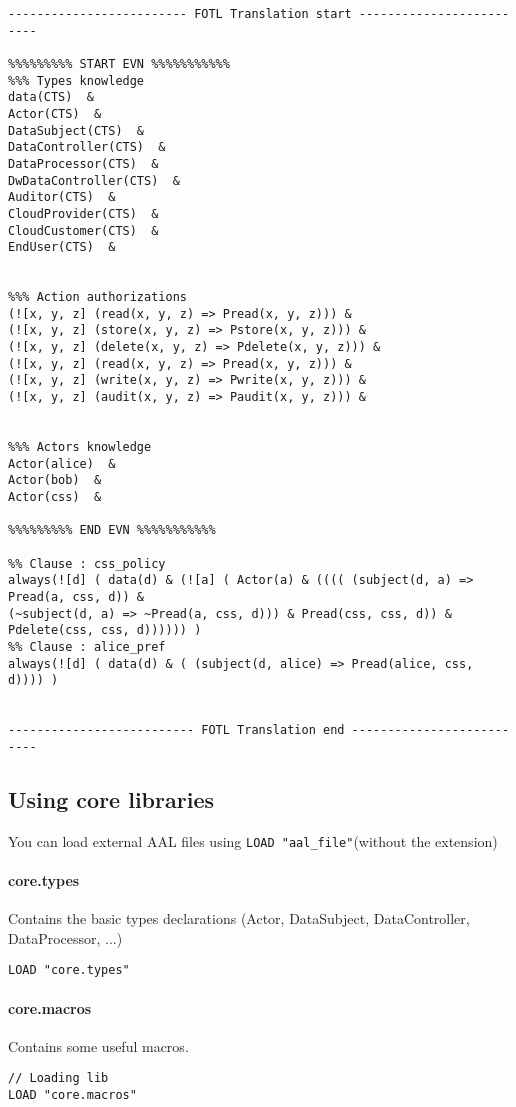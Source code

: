 \begin{itemize}
{\begin{lstlisting}
------------------------- FOTL Translation start -------------------------

%%%%%%%%% START EVN %%%%%%%%%%%
%%% Types knowledge
data(CTS)  &
Actor(CTS)  &
DataSubject(CTS)  &
DataController(CTS)  &
DataProcessor(CTS)  &
DwDataController(CTS)  &
Auditor(CTS)  &
CloudProvider(CTS)  &
CloudCustomer(CTS)  &
EndUser(CTS)  &


%%% Action authorizations
(![x, y, z] (read(x, y, z) => Pread(x, y, z))) &
(![x, y, z] (store(x, y, z) => Pstore(x, y, z))) &
(![x, y, z] (delete(x, y, z) => Pdelete(x, y, z))) &
(![x, y, z] (read(x, y, z) => Pread(x, y, z))) &
(![x, y, z] (write(x, y, z) => Pwrite(x, y, z))) &
(![x, y, z] (audit(x, y, z) => Paudit(x, y, z))) &


%%% Actors knowledge
Actor(alice)  &
Actor(bob)  &
Actor(css)  &

%%%%%%%%% END EVN %%%%%%%%%%%

%% Clause : css_policy
always(![d] ( data(d) & (![a] ( Actor(a) & (((( (subject(d, a) => Pread(a, css, d)) &
(~subject(d, a) => ~Pread(a, css, d))) & Pread(css, css, d)) & Pdelete(css, css, d)))))) )
%% Clause : alice_pref
always(![d] ( data(d) & ( (subject(d, alice) => Pread(alice, css, d)))) )


-------------------------- FOTL Translation end --------------------------
\end{lstlisting}
}
\end{itemize}





\subsection{Using core libraries}
You can load external AAL files using \texttt{LOAD "aal\_file"}(without the extension) 

\paragraph{core.types} Contains the basic types declarations (Actor, DataSubject, DataController, DataProcessor, ...)
\begin{lstlisting}
LOAD "core.types"
\end{lstlisting}


\paragraph{core.macros} Contains some useful macros.
\begin{lstlisting}
// Loading lib
LOAD "core.macros"


\end{lstlisting}




